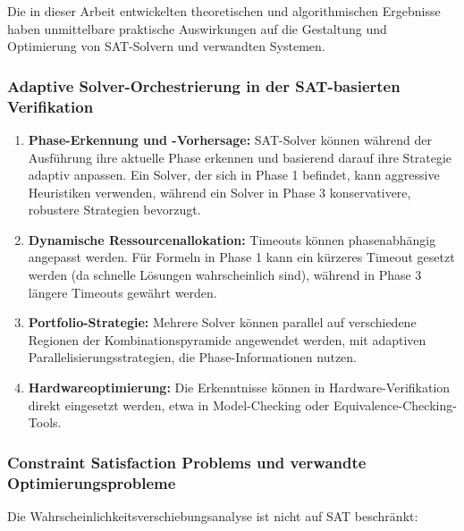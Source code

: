 ﻿\documentclass[a4paper,12pt]{article}
\theoremstyle{definition}
\begin{document}
Die in dieser Arbeit entwickelten theoretischen und algorithmischen Ergebnisse haben unmittelbare praktische Auswirkungen auf die Gestaltung und Optimierung von SAT-Solvern und verwandten Systemen.

\subsubsection{Adaptive Solver-Orchestrierung in der SAT-basierten Verifikation}

\begin{enumerate}
	\item \textbf{Phase-Erkennung und -Vorhersage:} SAT-Solver können während der Ausführung ihre aktuelle Phase erkennen und basierend darauf ihre Strategie adaptiv anpassen. Ein Solver, der sich in Phase 1 befindet, kann aggressive Heuristiken verwenden, während ein Solver in Phase 3 konservativere, robustere Strategien bevorzugt.
	
	\item \textbf{Dynamische Ressourcenallokation:} Timeouts können phasenabhängig angepasst werden. Für Formeln in Phase 1 kann ein kürzeres Timeout gesetzt werden (da schnelle Lösungen wahrscheinlich sind), während in Phase 3 längere Timeouts gewährt werden.
	
	\item \textbf{Portfolio-Strategie:} Mehrere Solver können parallel auf verschiedene Regionen der Kombinationspyramide angewendet werden, mit adaptiven Parallelisierungsstrategien, die Phase-Informationen nutzen.
	
	\item \textbf{Hardwareoptimierung:} Die Erkenntnisse können in Hardware-Verifikation direkt eingesetzt werden, etwa in Model-Checking oder Equivalence-Checking-Tools.
\end{enumerate}

\subsubsection{Constraint Satisfaction Problems und verwandte Optimierungsprobleme}

Die Wahrscheinlichkeitsverschiebungsanalyse ist nicht auf SAT beschränkt:
\end{document}
